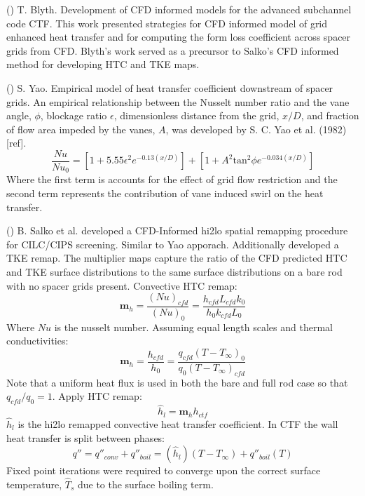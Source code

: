     \item (\checkmark) T. Blyth.  Development of CFD informed models for the advanced subchannel code CTF.  This work presented strategies for CFD informed model of grid enhanced heat transfer and for computing the form loss coefficient across spacer grids from CFD.  Blyth's work served as a precursor to Salko's CFD informed method for developing HTC and TKE maps.
    \item (\checkmark) S. Yao.  Empirical model of heat transfer coefficient downstream of spacer grids. \cite{yao82}
    An empirical relationship between the Nusselt number ratio and the vane angle, $\phi$, blockage ratio $\epsilon$, dimensionless distance from the grid, $x/D$, and fraction of flow area impeded by the vanes, $A$, was developed by S. C. Yao et al. (1982) [ref].
\begin{equation}
\frac{Nu}{Nu_0}  = \left[ 1 + 5.55 \epsilon^2 e^{-0.13(x/D)}\right] + \left[ 1 + A^2\mathrm{tan}^2\phi e^{-0.034(x/D)} \right]
\end{equation}
Where the first term is accounts for the effect of grid flow restriction and the second term represents the contribution of vane induced swirl on the heat transfer.

    \item (\checkmark) B. Salko et al. developed a CFD-Informed hi2lo spatial remapping procedure for CILC/CIPS screening. \cite{salko17}
    Similar to Yao apporach.  Additionally developed a TKE remap.
    The multiplier maps capture the ratio of the CFD predicted HTC and TKE surface distributions to the same surface distributions on a bare rod with no spacer grids present.
    Convective HTC remap:
    \begin{equation}
        \mathbf m_h = \frac{(Nu)_{cfd}}{(Nu)_{0}} = \frac{h_{cfd} L_{cfd} k_{0} }{h_{0}k_{cfd} L_{0}}
    \end{equation}
    Where $Nu$ is the nusselt number.  Assuming equal length scales and thermal conductivities:
    \begin{equation}
        \mathbf m_h = \frac{h_{cfd}}{h_{0}} = \frac{q_{cfd}(T-T_\infty)_{0}}{q_{0}(T-T_\infty)_{cfd}}
    \end{equation}
    Note that a uniform heat flux is used in both the bare and full rod case so that $q_{cfd}/q_0 =1 $.
    Apply HTC remap:
    \begin{equation}
        \hat h_{l} = \mathbf m_h h_{ctf}
    \end{equation}
    $\hat h_l$ is the hi2lo remapped convective heat transfer coefficient.  In CTF the wall heat transfer is split between phases:
    \begin{equation}
        q'' = q''_{conv} + q''_{boil} = (\hat h_l)(T-T_{\infty}) + q''_{boil}(T)
    \end{equation}
    Fixed point iterations were required to converge upon the correct surface temperature, $\hat T_s$ due to the surface boiling term.

